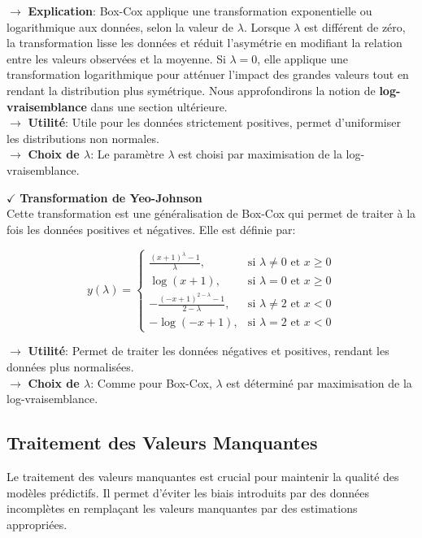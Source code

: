 \textbf{\(\rightarrow\)} \textbf{Explication}: Box-Cox applique une transformation exponentielle ou logarithmique aux données, selon la valeur de $\lambda$. Lorsque $\lambda$ est différent de zéro, la transformation lisse les données et réduit l'asymétrie en modifiant la relation entre les valeurs observées et la moyenne. Si $\lambda = 0$, elle applique une transformation logarithmique pour atténuer l'impact des grandes valeurs tout en rendant la distribution plus symétrique. Nous approfondirons la notion de \textbf{log-vraisemblance} dans une section ultérieure.\\
\textbf{\(\rightarrow\)} \textbf{Utilité}: Utile pour les données strictement positives, permet d'uniformiser les distributions non normales.\\
\textbf{\(\rightarrow\)} \textbf{Choix de $\lambda$}: Le paramètre $\lambda$ est choisi par maximisation de la log-vraisemblance.

\textbf{\(\checkmark\)} \textbf{Transformation de Yeo-Johnson} \\
Cette transformation est une généralisation de Box-Cox qui permet de traiter à la fois les données positives et négatives. Elle est définie par:

\[
y(\lambda) =
\begin{cases} 
\frac{(x + 1)^\lambda - 1}{\lambda}, & \text{si } \lambda \neq 0 \text{ et } x \geq 0 \\
\log(x + 1), & \text{si } \lambda = 0 \text{ et } x \geq 0 \\
-\frac{(-x + 1)^{2 - \lambda} - 1}{2 - \lambda}, & \text{si } \lambda \neq 2 \text{ et } x < 0 \\
-\log(-x + 1), & \text{si } \lambda = 2 \text{ et } x < 0
\end{cases}
\]

\noindent \textbf{\(\rightarrow\)} \textbf{Utilité}: Permet de traiter les données négatives et positives, rendant les données plus normalisées.\\
\textbf{\(\rightarrow\)} \textbf{Choix de $\lambda$}: Comme pour Box-Cox, $\lambda$ est déterminé par maximisation de la log-vraisemblance.

\subsection{Traitement des Valeurs Manquantes}

Le traitement des valeurs manquantes est crucial pour maintenir la qualité des modèles prédictifs. Il permet d'éviter les biais introduits par des données incomplètes en remplaçant les valeurs manquantes par des estimations appropriées.

